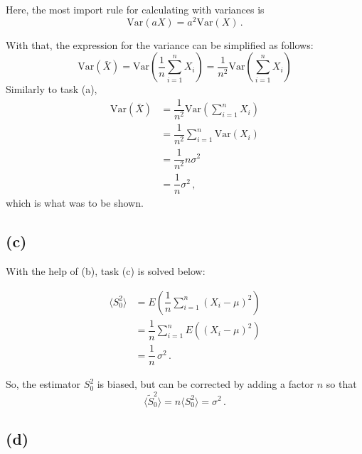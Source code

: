 Here, the most import rule for calculating with variances is
\begin{equation*}
    \text{Var}(aX) = a^2 \text{Var}(X) \,.
\end{equation*}

With that, the expression for the variance can be simplified as follows:
\begin{equation*}
    \text{Var}(\bar{X}) = \text{Var} \left(\dfrac{1}{n} \sum_{i=1}^n X_i \right) = \dfrac{1}{n^2} \text{Var} \left(\sum_{i=1}^n X_i \right)
\end{equation*}
Similarly to task (a),
\begin{align*}
    \text{Var}(\bar{X}) &= \dfrac{1}{n^2} \text{Var} \left(\sum_{i=1}^n X_i \right) \\
                        &= \dfrac{1}{n^2} \sum_{i=1}^n \text{Var}(X_i) \\
                        &= \dfrac{1}{n^2} n \sigma^2 \\
                        &= \dfrac{1}{n} \sigma^2 \,,
\end{align*}
which is what was to be shown.

\subsection*{(c)}

With the help of (b), task (c) is solved below:

\begin{align*}
    \langle S_0^2 \rangle &= E \left( \dfrac{1}{n} \sum_{i=1}^n (X_i - \mu)^2 \right) \\
                          &= \dfrac{1}{n} \sum_{i=1}^n E((X_i - \mu)^2) \\
                          &= \dfrac{1}{n}  \, \sigma^2 \,.
\end{align*}

So, the estimator $S_0^2$ is biased, but can be corrected by adding a factor $n$ so that
\begin{equation*}
    \langle \tilde{S}_0^2 \rangle = n \langle S_0^2 \rangle = \sigma^2 \,.
\end{equation*}

\subsection*{(d)}

